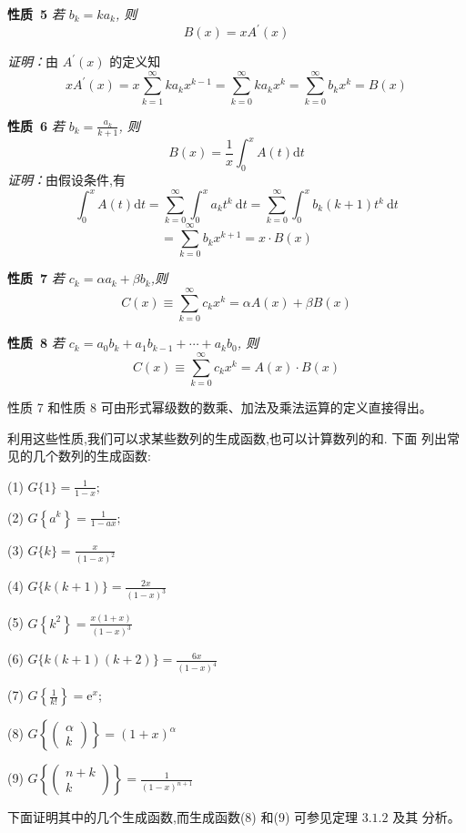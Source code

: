 \documentclass{report}
\begin{document}
\noindent
\textbf{性质\ 5} \textsl{若 $b_{k}=k a_{k}$, 则
$$
B(x)=x A^{\prime}(x)
$$}

\noindent
\textsl{证明：}由 $A^{\prime}(x)$ 的定义知
$$
x A^{\prime}(x)=x \sum_{k=1}^{\infty} k a_{k} x^{k-1}=\sum_{k=0}^{\infty} k a_{k} x^{k}=\sum_{k=0}^{\infty} b_{k} x^{k}=B(x)
$$


\noindent
\textbf{性质\ 6} \textsl{若 $b_{k}=\frac{a_{k}}{k+1}$, 则
$$
B(x)=\frac{1}{x} \int_{0}^{x} A(t) \mathrm{d} t
$$}
\textsl{证明：}由假设条件,有
$$
\int_{0}^{x} A(t) \mathrm{d} t=\sum_{k=0}^{\infty} \int_{0}^{x} a_{k} t^{k} \mathrm{~d} t=\sum_{k=0}^{\infty} \int_{0}^{x} b_{k}(k+1) t^{k} \mathrm{~d} t
$$
$$
=\sum_{k=0}^{\infty} b_{k} x^{k+1}=x \cdot B(x)
$$

\noindent
\textbf{性质\ 7} \textsl{若 $c_{k}=\alpha a_{k}+\beta b_{k}$,则
$$
C(x) \equiv \sum_{k=0}^{\infty} c_{k} x^{k}=\alpha A(x)+\beta B(x)
$$}

\noindent
\textbf{性质\ 8} \textsl{若 $c_{k}=a_{0} b_{k}+a_{1} b_{k-1}+\cdots+a_{k} b_{0}$, 则
$$
C(x) \equiv \sum_{k=0}^{\infty} c_{k} x^{k}=A(x) \cdot B(x)
$$}

性质 7 和性质 8 可由形式幂级数的数乘、加法及乘法运算的定义直接得出。

利用这些性质,我们可以求某些数列的生成函数,也可以计算数列的和. 下面 列出常见的几个数列的生成函数:

(1) $G\{1\}=\frac{1}{1-x} ;$

(2) $G\left\{a^{k}\right\}=\frac{1}{1-a x} ;$

(3) $G\{k\}=\frac{x}{(1-x)^{2}}$

(4) $G\{k(k+1)\}=\frac{2 x}{(1-x)^{3}}$

(5) $G\left\{k^{2}\right\}=\frac{x(1+x)}{(1-x)^{3}}$

(6) $G\{k(k+1)(k+2)\}=\frac{6 x}{(1-x)^{4}}$

(7) $G\left\{\frac{1}{k !}\right\}=\mathrm{e}^{x}$;

(8) $G\left\{\left(\begin{array}{l}\alpha \\ k\end{array}\right)\right\}=(1+x)^{\alpha}$

(9) $G\left\{\left(\begin{array}{c}n+k \\ k\end{array}\right)\right\}=\frac{1}{(1-x)^{n+1}}$

下面证明其中的几个生成函数,而生成函数(8) 和(9) 可参见定理 $3.1.2$ 及其 分析。
\end{document}
